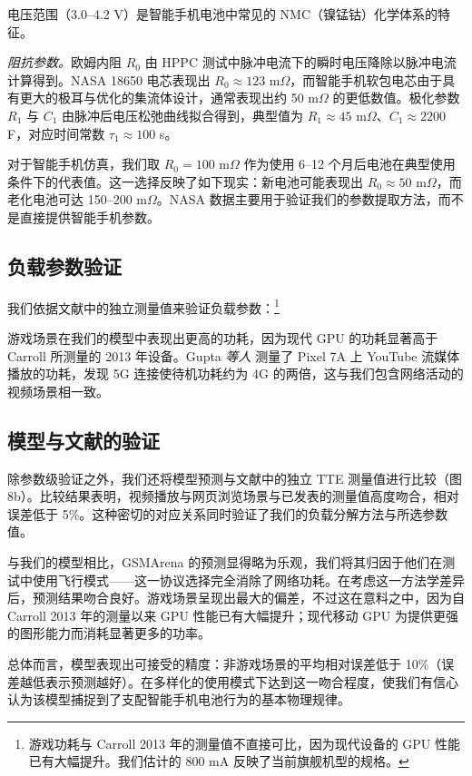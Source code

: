 \documentclass[11pt,a4paper]{ctexart}
\begin{document}
电压范围（3.0--4.2 V）是智能手机电池中常见的 NMC（镍锰钴）化学体系的特征。

\textit{阻抗参数。}欧姆内阻 $R_0$ 由 HPPC 测试中脉冲电流下的瞬时电压降除以脉冲电流计算得到。NASA 18650 电芯表现出 $R_0 \approx 123$ m$\Omega$，而智能手机软包电芯由于具有更大的极耳与优化的集流体设计，通常表现出约 50 m$\Omega$ 的更低数值。极化参数 $R_1$ 与 $C_1$ 由脉冲后电压松弛曲线拟合得到，典型值为 $R_1 \approx 45$ m$\Omega$、$C_1 \approx 2200$ F，对应时间常数 $\tau_1 \approx 100$ s。

对于智能手机仿真，我们取 $R_0 = 100$ m$\Omega$ 作为使用 6--12 个月后电池在典型使用条件下的代表值。这一选择反映了如下现实：新电池可能表现出 $R_0 \approx 50$ m$\Omega$，而老化电池可达 150--200 m$\Omega$。NASA 数据主要用于验证我们的参数提取方法，而不是直接提供智能手机参数。

\subsection{负载参数验证}

我们依据文献中的独立测量值来验证负载参数：\footnote{游戏功耗与 Carroll 2013 年的测量值不直接可比，因为现代设备的 GPU 性能已有大幅提升。我们估计的 800 mA 反映了当前旗舰机型的规格。}

游戏场景在我们的模型中表现出更高的功耗，因为现代 GPU 的功耗显著高于 Carroll 所测量的 2013 年设备。Gupta \textit{等人} \cite{ref2} 测量了 Pixel 7A 上 YouTube 流媒体播放的功耗，发现 5G 连接使待机功耗约为 4G 的两倍，这与我们包含网络活动的视频场景相一致。

\subsection{模型与文献的验证}

除参数级验证之外，我们还将模型预测与文献中的独立 TTE 测量值进行比较（图 8b）。比较结果表明，视频播放与网页浏览场景与已发表的测量值高度吻合，相对误差低于 5\%。这种密切的对应关系同时验证了我们的负载分解方法与所选参数值。

与我们的模型相比，GSMArena 的预测显得略为乐观，我们将其归因于他们在测试中使用飞行模式——这一协议选择完全消除了网络功耗。在考虑这一方法学差异后，预测结果吻合良好。游戏场景呈现出最大的偏差，不过这在意料之中，因为自 Carroll 2013 年的测量以来 GPU 性能已有大幅提升；现代移动 GPU 为提供更强的图形能力而消耗显著更多的功率。

总体而言，模型表现出可接受的精度：非游戏场景的平均相对误差低于 10\%（误差越低表示预测越好）。在多样化的使用模式下达到这一吻合程度，使我们有信心认为该模型捕捉到了支配智能手机电池行为的基本物理规律。
\end{document}
